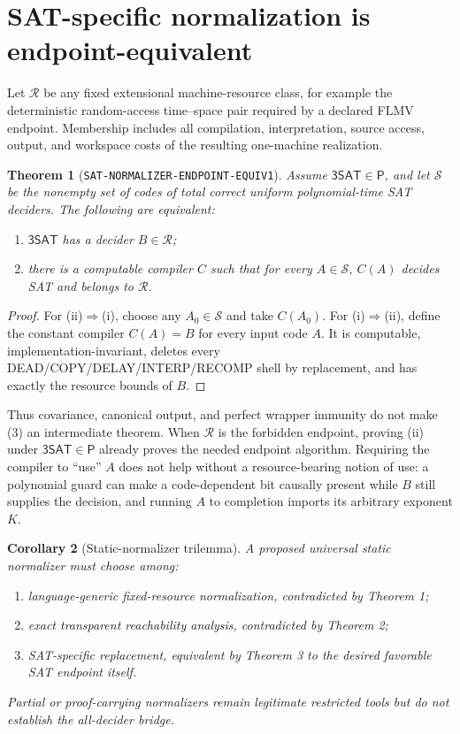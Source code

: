 \documentclass[11pt]{article}
\newtheorem{theorem}{Theorem}
\newtheorem{corollary}[theorem]{Corollary}
\newcommand{\SAT}{\mathsf{3SAT}}
\begin{document}
\section{SAT-specific normalization is endpoint-equivalent}

Let $\mathcal R$ be any fixed extensional machine-resource class, for example
the deterministic random-access time--space pair required by a declared FLMV
endpoint.  Membership includes all compilation, interpretation, source
access, output, and workspace costs of the resulting one-machine realization.

\begin{theorem}[\texttt{SAT-NORMALIZER-ENDPOINT-EQUIV1}]
Assume $\SAT\in\mathsf P$, and let $\mathcal S$ be the nonempty set of codes
of total correct uniform polynomial-time SAT deciders.  The following are
equivalent:
\begin{enumerate}[label=(\roman*)]
\item $\SAT$ has a decider $B\in\mathcal R$;
\item there is a computable compiler $C$ such that for every $A\in\mathcal S$,
$C(A)$ decides SAT and belongs to $\mathcal R$.
\end{enumerate}
\end{theorem}

\begin{proof}
For (ii)$\Rightarrow$(i), choose any $A_0\in\mathcal S$ and take $C(A_0)$.
For (i)$\Rightarrow$(ii), define the constant compiler $C(A)=B$ for every
input code $A$.  It is computable, implementation-invariant, deletes every
DEAD/COPY/DELAY/INTERP/RECOMP shell by replacement, and has exactly the
resource bounds of $B$.
\end{proof}

Thus covariance, canonical output, and perfect wrapper immunity do not make
(3) an intermediate theorem.  When $\mathcal R$ is the forbidden endpoint,
proving (ii) under $\SAT\in\mathsf P$ already proves the needed endpoint
algorithm.  Requiring the compiler to ``use'' $A$ does not help without a
resource-bearing notion of use: a polynomial guard can make a code-dependent
bit causally present while $B$ still supplies the decision, and running $A$
to completion imports its arbitrary exponent $K$.

\begin{corollary}[Static-normalizer trilemma]
A proposed universal static normalizer must choose among:
\begin{enumerate}[label=(\alph*)]
\item language-generic fixed-resource normalization, contradicted by Theorem 1;
\item exact transparent reachability analysis, contradicted by Theorem 2;
\item SAT-specific replacement, equivalent by Theorem 3 to the desired
favorable SAT endpoint itself.
\end{enumerate}
Partial or proof-carrying normalizers remain legitimate restricted tools but
do not establish the all-decider bridge.
\end{corollary}
\end{document}
